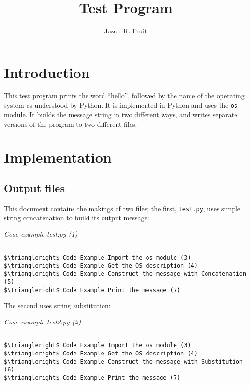 \documentclass{article}
\title{Test Program}
\author{Jason R. Fruit}
\begin{document}
\maketitle
\tableofcontents

\section{Introduction}

This test program prints the word ``hello'', followed by the name of
the operating system as understood by Python.  It is implemented in
Python and uses the \texttt{os} module.  It builds the message string
in two different ways, and writes separate versions of the program to
two different files.

\section{Implementation}

\subsection{Output files}

This document contains the makings of two files; the first,
\texttt{test.py}, uses simple string concatenation to build its output
message:

\label{pyweb1}
    \begin{flushleft}
    \textit{Code example test.py (1)}
    \begin{Verbatim}[commandchars=\\\{\},codes={\catcode`$=3\catcode`^=7},frame=single]

$\triangleright$ Code Example Import the os module (3)
$\triangleright$ Code Example Get the OS description (4)
$\triangleright$ Code Example Construct the message with Concatenation (5)
$\triangleright$ Code Example Print the message (7)

    \end{Verbatim}
    
    \end{flushleft}


The second uses string substitution:

\label{pyweb2}
    \begin{flushleft}
    \textit{Code example test2.py (2)}
    \begin{Verbatim}[commandchars=\\\{\},codes={\catcode`$=3\catcode`^=7},frame=single]

$\triangleright$ Code Example Import the os module (3)
$\triangleright$ Code Example Get the OS description (4)
$\triangleright$ Code Example Construct the message with Substitution (6)
$\triangleright$ Code Example Print the message (7)

    \end{Verbatim}
    
    \end{flushleft}
\end{document}
